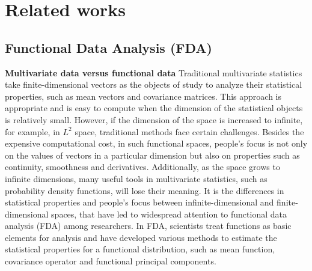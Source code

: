 \documentclass{article}
\begin{document}
\section{Related works}

\subsection{Functional Data Analysis (FDA)}

\textbf{Multivariate data versus functional data} 
Traditional multivariate statistics take finite-dimensional vectors as the objects of study to analyze their statistical properties, such as mean vectors and covariance matrices. 
This approach is appropriate and is easy to compute when the dimension of the statistical objects is relatively small. 
However, if the dimension of the space is increased to infinite, for example, in $L^2$ space, traditional methods face certain challenges. 
Besides the expensive computational cost, in such functional spaces, people's focus is not only on the values of vectors in a particular dimension but also on properties such as continuity, smoothness and derivatives. 
Additionally, as the space grows to infinite dimensions, many useful tools in multivariate statistics, such as probability density functions, will lose their meaning. 
It is the differences in statistical properties and people's focus between infinite-dimensional and finite-dimensional spaces, that have led to widespread attention to functional data analysis (FDA) \cite{wang2016functional,kokoszka2017introduction} among researchers.
In FDA, scientists treat functions as basic elements for analysis and have developed various methods to estimate the statistical properties for a functional distribution, such as mean function, covariance operator and functional principal components.
\end{document}
